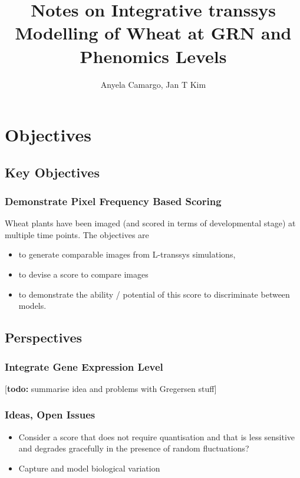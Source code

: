 \documentclass[a4paper,fleqn]{article}
\newcommand{\todo}[1]{
  \rule{0pt}{0pt}\marginpar{{\color{blue}\rule{1ex}{1ex}}}
  {[\textbf{\color{blue}todo:} #1]}}
\begin{document}
\title{Notes on Integrative transsys Modelling of Wheat at
  GRN and Phenomics Levels}
\author{Anyela Camargo, Jan T Kim}
\maketitle


\section{Objectives}

\subsection{Key Objectives}

\subsubsection{Demonstrate Pixel Frequency Based Scoring}

Wheat plants have been imaged (and scored in terms of developmental
stage) at multiple time points. The objectives are
\begin{itemize}
\item to generate comparable images from L-transsys simulations,
\item to devise a score to compare images
\item to demonstrate the ability / potential of this score to
  discriminate between models.
\end{itemize}


\subsection{Perspectives}

\subsubsection{Integrate Gene Expression Level}

\todo{summarise idea and problems with Gregersen stuff}

\subsubsection{Ideas, Open Issues}

\begin{itemize}
\item Consider a score that does not require quantisation and that is
  less sensitive and degrades gracefully in the presence of random
  fluctuations?
\item Capture and model biological variation
\end{itemize}
\end{document}
